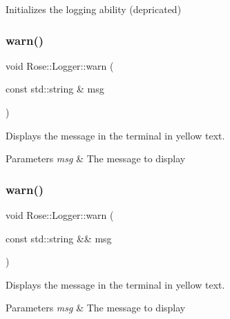 Initializes the logging ability (depricated) 

\mbox{\label{classRose_1_1Logger_ab745f1411496f7226630eb91a54d444b}} 
\subsubsection{\texorpdfstring{warn()}{warn()}\hspace{0.1cm}{\footnotesize\ttfamily [1/3]}}
{\footnotesize\ttfamily void Rose\+::\+Logger\+::warn (\begin{DoxyParamCaption}\item[{const std\+::string \&}]{msg }\end{DoxyParamCaption})\hspace{0.3cm}{\ttfamily [static]}}



Displays the message in the terminal in yellow text. 


\begin{DoxyParams}{Parameters}
{\em msg} & The message to display \\
\hline
\end{DoxyParams}
\mbox{\label{classRose_1_1Logger_aa950e16771d3c0b62dfafe6f39088d86}} 
\subsubsection{\texorpdfstring{warn()}{warn()}\hspace{0.1cm}{\footnotesize\ttfamily [2/3]}}
{\footnotesize\ttfamily void Rose\+::\+Logger\+::warn (\begin{DoxyParamCaption}\item[{const std\+::string \&\&}]{msg }\end{DoxyParamCaption})\hspace{0.3cm}{\ttfamily [static]}}



Displays the message in the terminal in yellow text. 


\begin{DoxyParams}{Parameters}
{\em msg} & The message to display \\
\hline
\end{DoxyParams}
\mbox{\label{classRose_1_1Logger_ad5905f310c92e3878eeaa9a4afe1c7f2}} 

